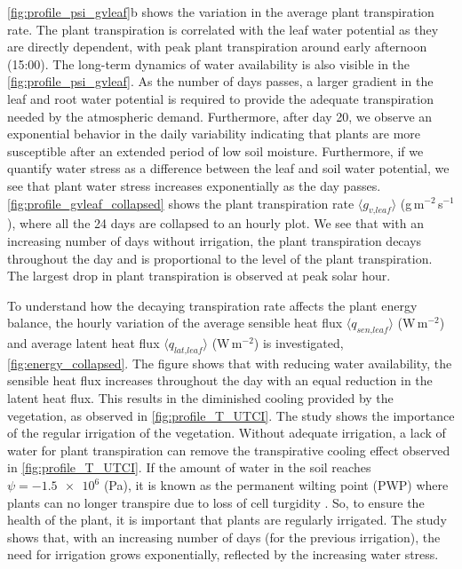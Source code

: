 \cref{fig:profile_psi_gvleaf}b shows the variation in the average plant transpiration rate. The plant transpiration is correlated with the leaf water potential as they are directly dependent, with peak plant transpiration around early afternoon (15:00).  The long-term dynamics of water availability is also visible in the \cref{fig:profile_psi_gvleaf}. As the number of days passes, a larger gradient in the leaf and root water potential is required to provide the adequate transpiration needed by the atmospheric demand. Furthermore, after day 20, we observe an exponential behavior in the daily variability indicating that plants are more susceptible after an extended period of low soil moisture. Furthermore, if we quantify water stress as a difference between the leaf and soil water potential, we see that plant water stress increases exponentially as the day passes. \cref{fig:profile_gvleaf_collapsed} shows the plant transpiration rate $\langle g_{\textit{v,leaf}} \rangle$ (g\,m$^{-2}$\,s$^{-1}$), where all the 24 days are collapsed to an hourly plot. We see that with an increasing number of days without irrigation, the plant transpiration decays throughout the day and is proportional to the level of the plant transpiration. The largest drop in plant transpiration is observed at peak solar hour.

To understand how the decaying transpiration rate affects the plant energy balance, the hourly variation of the average sensible heat flux $\langle q_{\textit{sen,leaf}} \rangle$ (W\,m$^{-2}$) and  average latent heat flux $\langle q_{\textit{lat,leaf}} \rangle$ (W\,m$^{-2}$) is investigated, \cref{fig:energy_collapsed}. The figure shows that with reducing water availability, the sensible heat flux increases throughout the day with an equal reduction in the latent heat flux.  This results in the diminished cooling provided by the vegetation, as observed in \cref{fig:profile_T_UTCI}. The study shows the importance of the regular irrigation of the vegetation. Without adequate irrigation, a lack of water for plant transpiration can remove the transpirative cooling effect observed in \cref{fig:profile_T_UTCI}. If the amount of water in the soil reaches $\psi = \num{-1.5e6}$ (Pa), it is known as the permanent wilting point (PWP) where plants can no longer transpire due to loss of cell turgidity \citep{Idso1977}. So, to ensure the health of the plant, it is important that plants are regularly irrigated. The study shows that, with an increasing number of days (for the previous irrigation), the need for irrigation grows exponentially, reflected by the increasing water stress.


